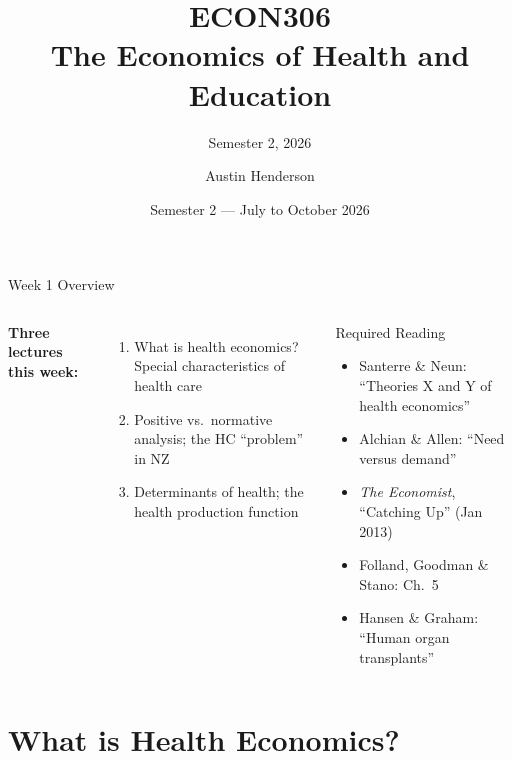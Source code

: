 \documentclass[aspectratio=169, 12pt]{beamer}
\title[ECON306: Health \& Education Economics]{ECON306\\The Economics of Health and Education}
\subtitle{Semester 2, 2026}
\author{Austin Henderson}
\institute{Department of Economics\\University of Otago}
\date{Semester 2 — July to October 2026}
\begin{document}
\maketitle


\begin{frame}{Week 1 Overview}
	\begin{columns}
		\textbf{Three lectures this week:}
		\begin{enumerate}
			\item What is health economics? Special characteristics of health care
			\item Positive vs.\ normative analysis; the HC ``problem'' in NZ
			\item Determinants of health; the health production function
		\end{enumerate}
		\begin{block}{Required Reading}
			{\footnotesize
				\begin{itemize}\setlength{\itemsep}{0.1em}
					\item Santerre \& Neun: ``Theories X and Y of health economics''
					\item Alchian \& Allen: ``Need versus demand''
					\item \textit{The Economist}, ``Catching Up'' (Jan 2013)
					\item Folland, Goodman \& Stano: Ch.\ 5
					\item Hansen \& Graham: ``Human organ transplants''
			\end{itemize}}
		\end{block}
	\end{columns}
\end{frame}

\section{What is Health Economics?}

\end{document}
